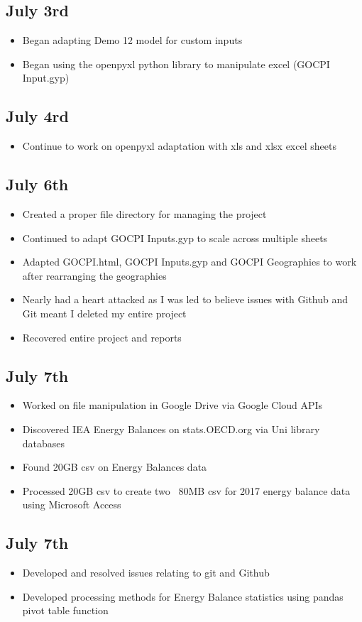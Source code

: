 \documentclass[12pt]{article}
\begin{document}
\subsection*{July 3rd}
\begin{itemize}
	\item Began adapting Demo 12 model for custom inputs
	\item Began using the openpyxl python library to manipulate excel (GOCPI Input.gyp)
\end{itemize}
\subsection*{July 4rd}
\begin{itemize}
	\item Continue to work on openpyxl adaptation with xls and xlsx excel sheets
\end{itemize}
\subsection*{July 6th}
\begin{itemize}
	\item Created a proper file directory for managing the project
	\item Continued to adapt GOCPI Inputs.gyp to scale across multiple sheets
	\item Adapted GOCPI.html, GOCPI Inputs.gyp and GOCPI Geographies to work after rearranging the geographies
	\item Nearly had a heart attacked as I was led to believe issues with Github and Git meant I deleted my entire project
	\item Recovered entire project and reports
\end{itemize}
\subsection*{July 7th}
\begin{itemize}
	\item Worked on file manipulation in Google Drive via Google Cloud APIs
	\item Discovered IEA Energy Balances on stats.OECD.org via Uni library databases
	\item Found 20GB csv on Energy Balances data
	\item Processed 20GB csv to create two ~80MB csv for 2017 energy balance data using Microsoft Access
\end{itemize}
\subsection*{July 7th}
\begin{itemize}
	\item Developed and resolved issues relating to git and Github
	\item Developed processing methods for Energy Balance statistics using pandas pivot table function
\end{itemize}
\end{document}
